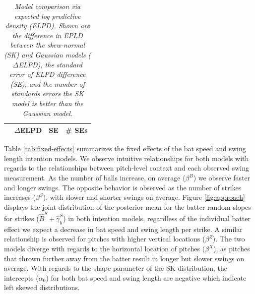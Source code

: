 \documentclass{article}
\begin{document}
\begin{table}[H]
        \centering
        \begin{tabular}{l|r|r|r|}
          & $\Delta$ELPD  & SE & \# SEs \\
          \hline
          
        \end{tabular}
        \caption{\it Model comparison via expected log predictive density (ELPD). Shown are the difference in EPLD between the skew-normal (SK) and Gaussian models ($\Delta$ELPD), the standard error of ELPD difference (SE), and the number of standards errors the SK model is better than the Gaussian model.}
        \label{tab:intention-model-elpd}
      \end{table}

       Table \ref{tab:fixed-effects} summarizes the fixed effects of the bat speed and swing length intention models. We observe intuitive relationships for both models with regards to the relationships between pitch-level context and each observed swing measurement. As the number of balls increase, on average ($\beta^B$) we observe faster and longer swings. The opposite behavior is observed as the number of strikes increases ($\beta^S$), with slower and shorter swings on average. Figure \ref{fig:approach} displays the joint distribution of the posterior mean for the batter random slopes for strikes ($\hat{B}^S + \hat{\gamma}_b^S$) in both intention models, regardless of the individual batter effect we expect a decrease in bat speed and swing length per strike. A similar relationship is observed for pitches with higher vertical locations ($\beta^Z$). The two models diverge with regards to the horizontal location of pitches ($\beta^X$), as pitches that thrown further away from the batter result in longer but slower swings on average. With regards to the shape parameter of the SK distribution, the intercepts ($\alpha_0$) for both bat speed and swing length are negative which indicate left skewed distributions.
\end{document}
